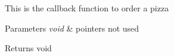 This is the callback function to order a pizza


\begin{DoxyParams}{Parameters}
{\em void} & pointers not used \\
\hline
\end{DoxyParams}
\begin{DoxyReturn}{Returns}
void 
\end{DoxyReturn}
